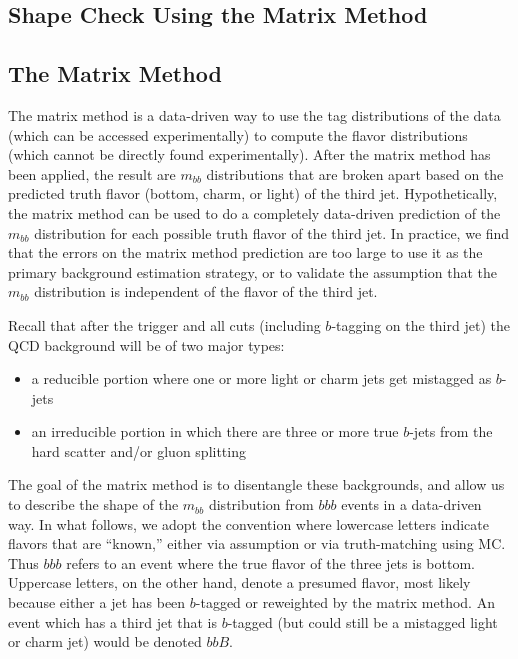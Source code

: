 \subsection{Shape Check Using the Matrix Method}








\subsection{The Matrix Method}
The matrix method is a data-driven way to use the tag distributions of the data (which can be accessed experimentally) to compute the flavor distributions (which cannot be directly found experimentally).  After the matrix method has been applied, the result are $m_{bb}$ distributions that are broken apart based on the predicted truth flavor (bottom, charm, or light) of the third jet.  Hypothetically,
the matrix method can be used to do a completely data-driven prediction of the $m_{bb}$ distribution
for each possible truth flavor of the third jet.  In practice, we find that the errors on the matrix
method prediction are too large to use it as the primary background estimation strategy, or to validate
the assumption that the $m_{bb}$ distribution is independent of the flavor of the third jet.  

Recall that after the trigger and all cuts (including $b$-tagging on the third jet) the QCD background will be of two major types:

\begin{itemize}
    \item a reducible portion where one or more light or charm jets get mistagged as $b$-jets
    \item an irreducible portion in which there are three or more true $b$-jets from the
hard scatter and/or gluon splitting
\end{itemize}


The goal of the matrix method is to disentangle these backgrounds, and allow us to describe the shape of the $m_{bb}$ distribution from $bbb$ events
in a data-driven way.  In what follows, we adopt the convention where lowercase letters indicate flavors
that are ``known,'' either via assumption or via truth-matching using MC.  Thus $bbb$ refers to an event where the true flavor of the three jets is bottom.  Uppercase letters,
on the other hand, denote a presumed flavor, most likely because either a jet has been $b$-tagged or reweighted by the matrix method.  An event which has a third jet
that is $b$-tagged (but could still be a mistagged light or charm jet) would be
denoted $bbB$.  

